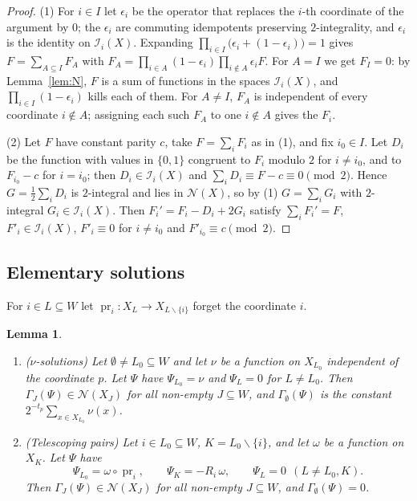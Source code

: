 \documentclass[11pt]{amsart}
\newtheorem{lemma}[theorem]{Lemma}
\theoremstyle{definition}
\theoremstyle{remark}
\newcommand{\Nn}{\mathcal N}
\DeclareMathOperator{\pr}{pr}
\numberwithin{equation}{section}
\begin{document}
\begin{proof}
(1) For $i\in I$ let $\epsilon_i$ be the operator that replaces the $i$-th coordinate of the argument by $0$; the $\epsilon_i$ are commuting idempotents preserving $2$-integrality, and $\epsilon_i$ is the identity on $\mathcal I_i(X)$.
Expanding $\prod_{i\in I}\bigl(\epsilon_i+(1-\epsilon_i)\bigr)=1$ gives $F=\sum_{A\subseteq I}F_A$ with $F_A=\prod_{i\in A}(1-\epsilon_i)\prod_{i\notin A}\epsilon_iF$.
For $A=I$ we get $F_I=0$: by Lemma~\ref{lem:N}, $F$ is a sum of functions in the spaces $\mathcal I_i(X)$, and $\prod_{i\in I}(1-\epsilon_i)$ kills each of them.
For $A\neq I$, $F_A$ is independent of every coordinate $i\notin A$; assigning each such $F_A$ to one $i\notin A$ gives the $F_i$.

(2) Let $F$ have constant parity $c$, take $F=\sum_iF_i$ as in (1), and fix $i_0\in I$.
Let $D_i$ be the function with values in $\{0,1\}$ congruent to $F_i$ modulo $2$ for $i\neq i_0$, and to $F_{i_0}-c$ for $i=i_0$; then $D_i\in\mathcal I_i(X)$ and $\sum_iD_i\equiv F-c\equiv0\pmod 2$.
Hence $G=\frac12\sum_iD_i$ is $2$-integral and lies in $\Nn(X)$, so by (1) $G=\sum_iG_i$ with $2$-integral $G_i\in\mathcal I_i(X)$.
Then $F_i'=F_i-D_i+2G_i$ satisfy $\sum_iF_i'=F$, $F'_i\in\mathcal I_i(X)$, $F'_i\equiv0$ for $i\ne i_0$ and $F'_{i_0}\equiv c\pmod 2$.
\end{proof}

\subsection{Elementary solutions}
For $i\in L\subseteq W$ let $\pr_i\colon X_L\to X_{L\smallsetminus\{i\}}$ forget the coordinate $i$.

\begin{lemma}\label{lem:elementary}
\begin{enumerate}
\item \textup{($\nu$-solutions)} Let $\emptyset\ne L_0\subseteq W$ and let $\nu$ be a function on $X_{L_0}$ independent of the coordinate $p$. Let $\Psi$ have $\Psi_{L_0}=\nu$ and $\Psi_L=0$ for $L\neq L_0$. Then $\Gamma_J(\Psi)\in\Nn(X_J)$ for all non-empty $J\subseteq W$, and $\Gamma_\emptyset(\Psi)$ is the constant $2^{-t_p}\sum_{x\in X_{L_0}}\nu(x)$.
\item \textup{(Telescoping pairs)} Let $i\in L_0\subseteq W$, $K=L_0\smallsetminus\{i\}$, and let $\omega$ be a function on $X_K$. Let $\Psi$ have
\[
\Psi_{L_0}=\omega\circ\pr_i,\qquad \Psi_K=-R_i\,\omega,\qquad \Psi_L=0\ \ (L\neq L_0,K).
\]
Then $\Gamma_J(\Psi)\in\Nn(X_J)$ for all non-empty $J\subseteq W$, and $\Gamma_\emptyset(\Psi)=0$.
\end{enumerate}
\end{lemma}
\end{document}
